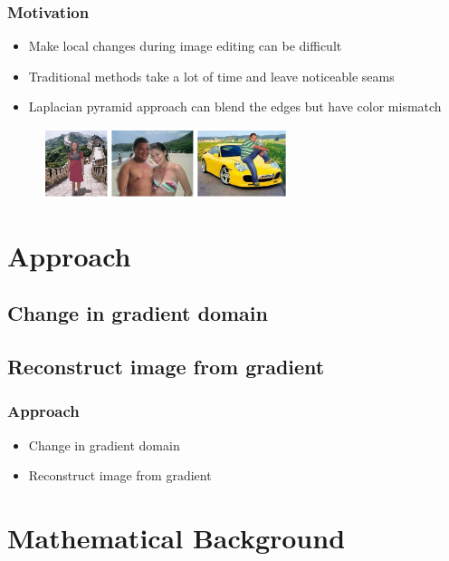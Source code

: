 \documentclass{beamer}
\begin{document}
\begin{frame}
\frametitle{Motivation} 
    \begin{itemize}
        \item Make local changes during image editing can be difficult
        \item Traditional methods take a lot of time and leave noticeable seams
        \item Laplacian pyramid approach can blend the edges but have color mismatch 
    \end{itemize}
    \begin{figure}[!ht]
        \centering
        \includegraphics[width=2.8in]{resource/traditional.png}        
    \end{figure}
\end{frame}


\section{Approach} 
\begin{frame}
\subsection{Change in gradient domain} 
\subsection{Reconstruct image from gradient} 
\frametitle{Approach} 
    \begin{itemize}
        \item Change in gradient domain
        \item Reconstruct image from gradient        
    \end{itemize}
\end{frame}


\section{Mathematical Background} 
\end{document}
